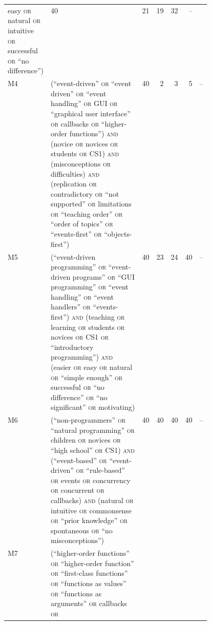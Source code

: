 \begin{table}[htbp]
\begin{tabular}{@{}lp{0.46\linewidth}rrrrr@{}}
       easy \textsc{or} natural \textsc{or} intuitive \textsc{or}
       successful \textsc{or} \enquote{no difference})
       & 40 & 21 & 19 & 32 & -- \\
    M4 & (\enquote{event-driven} \textsc{or} \enquote{event driven}
       \textsc{or} \enquote{event handling} \textsc{or} GUI \textsc{or}
       \enquote{graphical user interface} \textsc{or} callbacks
       \textsc{or} \enquote{higher-order functions}) \textsc{and} (novice
       \textsc{or} novices \textsc{or} students \textsc{or} CS1)
       \textsc{and} (misconceptions \textsc{or} difficulties) \textsc{and}
       (replication \textsc{or} contradictory \textsc{or} \enquote{not
       supported} \textsc{or} limitations \textsc{or} \enquote{teaching
       order} \textsc{or} \enquote{order of topics} \textsc{or}
       \enquote{events-first} \textsc{or} \enquote{objects-first})
       & 40 & 2 & 3 & 5 & -- \\
    M5 & (\enquote{event-driven programming} \textsc{or}
       \enquote{event-driven programs} \textsc{or} \enquote{GUI
       programming} \textsc{or} \enquote{event handling} \textsc{or}
       \enquote{event handlers} \textsc{or} \enquote{events-first})
       \textsc{and} (teaching \textsc{or} learning \textsc{or} students
       \textsc{or} novices \textsc{or} CS1 \textsc{or}
       \enquote{introductory programming}) \textsc{and} (easier
       \textsc{or} easy \textsc{or} natural \textsc{or} \enquote{simple
       enough} \textsc{or} successful \textsc{or} \enquote{no difference}
       \textsc{or} \enquote{no significant} \textsc{or} motivating)
       & 40 & 23 & 24 & 40 & -- \\
    M6 & (\enquote{non-programmers} \textsc{or} \enquote{natural
       programming} \textsc{or} children \textsc{or} novices \textsc{or}
       \enquote{high school} \textsc{or} CS1) \textsc{and}
       (\enquote{event-based} \textsc{or} \enquote{event-driven}
       \textsc{or} \enquote{rule-based} \textsc{or} events \textsc{or}
       concurrency \textsc{or} concurrent \textsc{or} callbacks)
       \textsc{and} (natural \textsc{or} intuitive \textsc{or}
       commonsense \textsc{or} \enquote{prior knowledge} \textsc{or}
       spontaneous \textsc{or} \enquote{no misconceptions})
       & 40 & 40 & 40 & 40 & -- \\
    M7 & (\enquote{higher-order functions} \textsc{or}
       \enquote{higher-order function} \textsc{or} \enquote{first-class
       functions} \textsc{or} \enquote{functions as values} \textsc{or}
       \enquote{functions as arguments} \textsc{or} callbacks \textsc{or}

\end{tabular}
\end{table}
